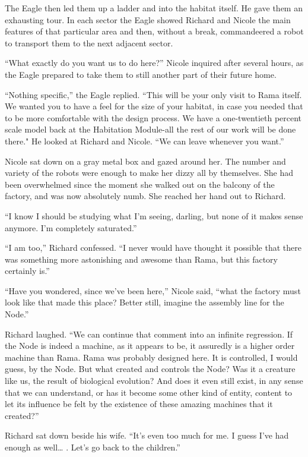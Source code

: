 \documentclass[]{article}
\begin{document}
{The Eagle then led them up a ladder and into the habitat itself.  He gave them an exhausting tour.  In each sector the Eagle showed Richard and Nicole the main features of that particular area and then, without a break, commandeered a robot to transport them to the next adjacent sector.

“What exactly do you want us to do here?” Nicole inquired after several hours, as the Eagle prepared to take them to still another part of their future home.

“Nothing specific,” the Eagle replied.  “This will be your only visit to Rama itself.  We wanted you to have a feel for the size of your habitat, in case you needed that to be more comfortable with the design process.  We have a one-twentieth percent scale model back at the Habitation Module-all the rest of our work will be done there."  He looked at Richard and Nicole.  “We can leave whenever you want.”

Nicole sat down on a gray metal box and gazed around her.  The number and variety of the robots were enough to make her dizzy all by themselves.  She had been overwhelmed since the moment she walked out on the balcony of the factory, and was now absolutely numb.  She reached her hand out to Richard.

“I know I should be studying what I’m seeing, darling, but none of it makes sense anymore.  I’m completely saturated.”

“I am too,” Richard confessed.  “I never would have thought it possible that there was something more astonishing and awesome than Rama, but this factory certainly is.”

“Have you wondered, since we’ve been here,” Nicole said, “what the factory must look like that made this place? Better still, imagine the assembly line for the Node.”

Richard laughed.  “We can continue that comment into an infinite regression.  If the Node is indeed a machine, as it appears to be, it assuredly is a higher order machine than Rama.  Rama was probably designed here.  It is controlled, I would guess, by the Node.  But what created and controls the Node? Was it a creature like us, the result of biological evolution? And does it even still exist, in any sense that we can understand, or has it become some other kind of entity, content to let its influence be felt by the existence of these amazing machines that it created?”

Richard sat down beside his wife.  “It’s even too much for me.  I guess I’ve had enough as well… .  Let’s go back to the children.”

}
\end{document}
